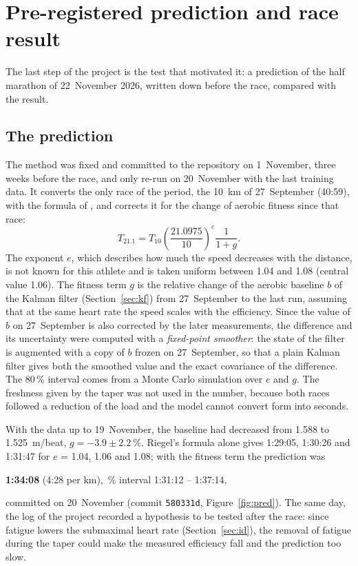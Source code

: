 \documentclass[11pt,a4paper]{article}
\begin{document}
\section{Pre-registered prediction and race result}\label{sec:race}

The last step of the project is the test that motivated it: a prediction of the
half marathon of 22~November 2026, written down before the race, compared with
the result.

\subsection{The prediction}
The method was fixed and committed to the repository on 1~November, three weeks
before the race, and only re-run on 20~November with the last training data. It
converts the only race of the period, the \SI{10}{km} of 27~September (40:59),
with the formula of \citet{riegel1981}, and corrects it for the change of aerobic
fitness since that race:
\begin{equation}
T_{21.1} = T_{10}\left(\frac{21.0975}{10}\right)^{e} \frac{1}{1 + g}.
\label{eq:pred}
\end{equation}
The exponent $e$, which describes how much the speed decreases with the distance,
is not known for this athlete and is taken uniform between 1.04 and 1.08 (central
value 1.06). The fitness term $g$ is the relative change of the aerobic baseline
$b$ of the Kalman filter (Section~\ref{sec:kf}) from 27~September to the last
run, assuming that at the same heart rate the speed scales with the efficiency.
Since the value of $b$ on 27~September is also corrected by the later
measurements, the difference and its uncertainty were computed with a
\emph{fixed-point smoother}: the state of the filter is augmented with a copy of
$b$ frozen on 27~September, so that a plain Kalman filter gives both the smoothed
value and the exact covariance of the difference. The 80\,\% interval comes from a
Monte Carlo simulation over $e$ and $g$. The freshness given by the taper was not
used in the number, because both races followed a reduction of the load and the
model cannot convert form into seconds.

With the data up to 19~November, the baseline had decreased from 1.588 to
\SI{1.525}{m/beat}, $g = -3.9 \pm \SI{2.2}{\percent}$. Riegel's formula alone gives
1:29:05, 1:30:26 and 1:31:47 for $e$ = 1.04, 1.06 and 1.08; with the fitness term
the prediction was
\begin{center}
\textbf{1:34:08} (4:28 per km), \,\% interval 1:31:12 -- 1:37:14,
\end{center}
committed on 20~November (commit \texttt{580331d}, Figure~\ref{fig:pred}). The
same day, the log of the project recorded a hypothesis to be tested after the
race: since fatigue lowers the submaximal heart rate (Section~\ref{sec:id}), the
removal of fatigue during the taper could make the measured efficiency fall and
the prediction too slow.
\end{document}
